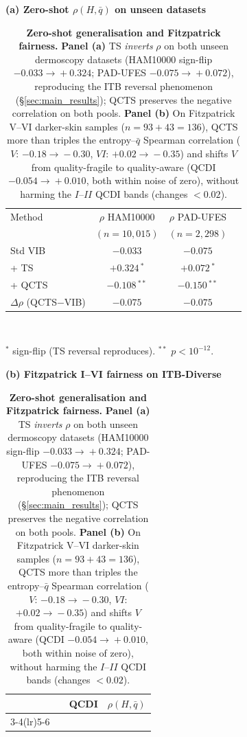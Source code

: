 \begin{table}[!t]
\centering
\caption{\textbf{Zero-shot generalisation and Fitzpatrick fairness.}
\textbf{Panel (a)} TS \emph{inverts} $\rho$ on both unseen dermoscopy datasets (HAM10000 sign-flip $-0.033\!\to\!+0.324$; PAD-UFES $-0.075\!\to\!+0.072$), reproducing the ITB reversal phenomenon (\S\ref{sec:main_results}); QCTS preserves the negative correlation on both pools.
\textbf{Panel (b)} On Fitzpatrick V--VI darker-skin samples ($n{=}93{+}43{=}136$), QCTS more than triples the entropy--$\bar q$ Spearman correlation ($V$: $-0.18\!\to\!-0.30$, $VI$: $+0.02\!\to\!-0.35$) and shifts $V$ from quality-fragile to quality-aware (QCDI $-0.054\!\to\!+0.010$, both within noise of zero), without harming the $I$--$II$ QCDI bands (changes ${<}0.02$).}
\label{tab:generalisation}
\vspace{4pt}
\footnotesize
\setlength{\tabcolsep}{4pt}
\renewcommand{\arraystretch}{1.05}
\begin{minipage}[t]{0.46\linewidth}
\centering
\textbf{(a) Zero-shot $\rho(H,\bar q)$ on unseen datasets}\par\vspace{2pt}
\begin{tabular}{lccc}
\toprule
Method & $\rho$ HAM10000 & $\rho$ PAD-UFES \\
& $(n{=}10{,}015)$ & $(n{=}2{,}298)$ \\
\midrule
Std VIB        & $-0.033$         & $-0.075$ \\
\;+ TS         & $+0.324$\,$^*$   & $+0.072$\,$^*$ \\
\;+ QCTS       & $\mathbf{-0.108}$\,$^{**}$ & $\mathbf{-0.150}$\,$^{**}$ \\
\midrule
$\Delta\rho$ (QCTS$-$VIB) & $-0.075$ & $-0.075$ \\
\bottomrule
\end{tabular}
\vspace{2pt}\\
\scriptsize\raggedright$^*$ sign-flip (TS reversal reproduces). $^{**}$ $p<10^{-12}$.
\end{minipage}\hfill
\begin{minipage}[t]{0.50\linewidth}
\centering
\textbf{(b) Fitzpatrick I--VI fairness on ITB-Diverse}\par\vspace{2pt}
\begin{tabular}{lrcccc}
\toprule
& & \multicolumn{2}{c}{QCDI} & \multicolumn{2}{c}{$\rho(H,\bar q)$} \\
\cmidrule(lr){3-4}\cmidrule(lr){5-6}

\end{tabular}
\end{minipage}
\end{table}
